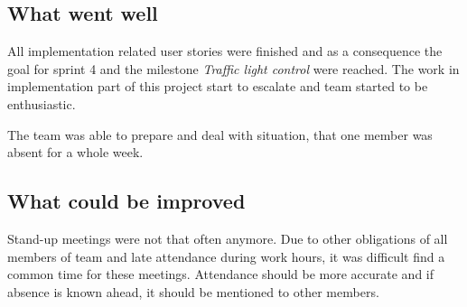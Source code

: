 \subsection{What went well}
All implementation related user stories were finished and as a consequence the goal for sprint 4 and the milestone \emph{Traffic light control} were reached.
The work in implementation part of this project start to escalate and team started to be enthusiastic.

The team was able to prepare and deal with situation, that one member was absent for a whole week.

\subsection{What could be improved}
Stand-up meetings were not that often anymore.
Due to other obligations of all members of team and late attendance during work hours, it was difficult find a common time for these meetings.
Attendance should be more accurate and if absence is known ahead, it should be mentioned to other members.

